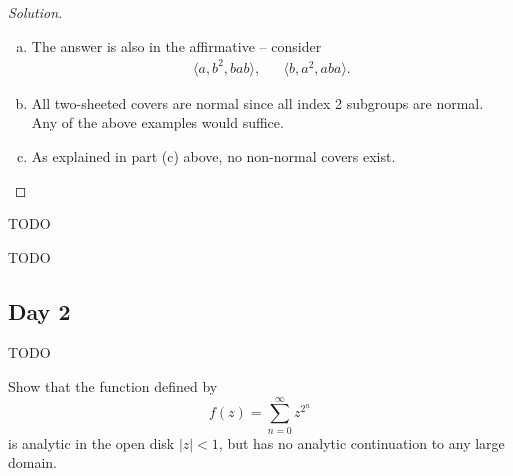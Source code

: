 \begin{proof}[Solution]
\begin{enumerate}[(a)]
  \item
    The answer is also in the affirmative -- consider
    \begin{align*}
      \langle a, b^2, b a b \rangle, &&
      \langle b, a^2, a b a \rangle.
    \end{align*}
    
  \item
    All two-sheeted covers are normal since all index 2 subgroups are normal. Any of the above examples would suffice.
    
  \item
    As explained in part (c) above, no non-normal covers exist. \qedhere
  \end{enumerate}
\end{proof}


TODO


TODO

\subsection{Day 2}
\label{S:spring-2009-2}
\mbox{}


TODO


Show that the function defined by
\[
f(z) = \sum_{n=0}^\infty z^{2^n}
\]
is analytic in the open disk $|z| < 1$, but has no analytic continuation to any large domain.

